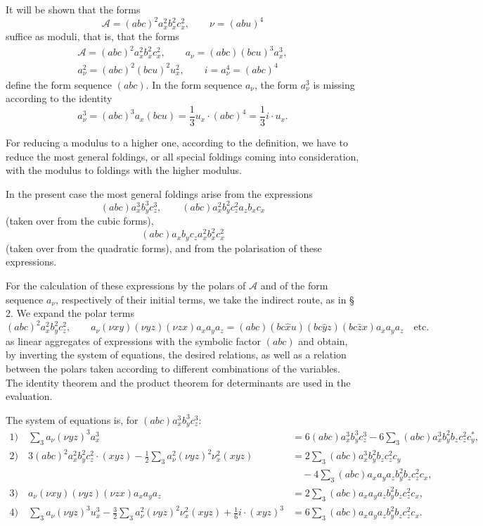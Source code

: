 \documentclass[11pt]{article}
\newcommand{\A}{\mathcal A}
\begin{document}
It will be shown that the forms
\[
\A=(abc)^2a_x^2b_x^2c_x^2,\qquad \nu=(abu)^4
\]
suffice as moduli, that is, that the forms
\[
\begin{gathered}
\A=(abc)^2a_x^2b_x^2c_x^2,\qquad
a_\nu=(abc)(bcu)^3a_x^3,\\
a_\nu^2=(abc)^2(bcu)^2u_x^2,\qquad
i=a_\nu^4=(abc)^4
\end{gathered}
\]
define the form sequence $(abc)$. In the form sequence $a_\nu$, the form $a_\nu^3$ is missing according to the identity
\[
a_\nu^3=(abc)^3a_x(bcu)=\frac13 u_x\cdot(abc)^4=\frac13 i\cdot u_x.
\]

For reducing a modulus to a higher one, according to the definition, we have to reduce the most general foldings, or all special foldings coming into consideration, with the modulus to foldings with the higher modulus.

In the present case the most general foldings arise from the expressions
\[
(abc)a_x^3b_y^3c_z^3,\qquad
(abc)a_x^2b_y^2c_z^2a_zb_xc_x
\]
(taken over from the cubic forms),
\[
(abc)a_xb_yc_za_x^2b_x^2c_x^2
\]
(taken over from the quadratic forms), and from the polarisation of these expressions.

For the calculation of these expressions by the polars of $\A$ and of the form sequence $a_\nu$, respectively of their initial terms, we take the indirect route, as in § 2. We expand the polar terms
\[
(abc)^2a_x^2b_y^2c_z^2,\qquad
a_\nu(\nu xy)(\nu yz)(\nu zx)a_xa_ya_z
=(abc)(bc\widehat{x}u)(bc\widehat{y}z)(bc\widehat{z}x)a_xa_ya_z\quad\text{etc.}
\]
as linear aggregates of expressions with the symbolic factor $(abc)$ and obtain, by inverting the system of equations, the desired relations, as well as a relation between the polars taken according to different combinations of the variables. The identity theorem and the product theorem for determinants are used in the evaluation.

The system of equations is, for $(abc)a_x^3b_y^3c_z^3$:
\begingroup\small
\[
\begin{aligned}
1)\quad
\sum_3 a_\nu(\nu yz)^3a_x^3
&=6(abc)a_x^3b_y^3c_z^3
-6\sum_3(abc)a_x^3b_y^2b_zc_z^2c_y^{*},\\[0.4em]
2)\quad
3(abc)^2a_x^2b_y^2c_z^2\cdot(xyz)
-\frac12\sum_3 a_\nu^2(\nu yz)^2\nu_x^2(xyz)
&=2\sum_3(abc)a_x^3b_y^2b_zc_z^2c_y\\
&\quad-4\sum_3(abc)a_xa_ya_zb_y^2b_zc_z^2c_x,\\[0.4em]
3)\quad
a_\nu(\nu xy)(\nu yz)(\nu zx)a_xa_ya_z
&=2\sum_3(abc)a_xa_ya_zb_y^2b_zc_z^2c_x,\\[0.4em]
4)\quad
\sum_3 a_\nu(\nu yz)^3u_x^3
-\frac32\sum_3 a_\nu^2(\nu yz)^2\nu_x^2(xyz)
+\frac16 i\cdot(xyz)^3
&=6\sum_3(abc)a_xa_ya_zb_y^2b_zc_z^2c_x.
\end{aligned}
\]
\endgroup
\end{document}

